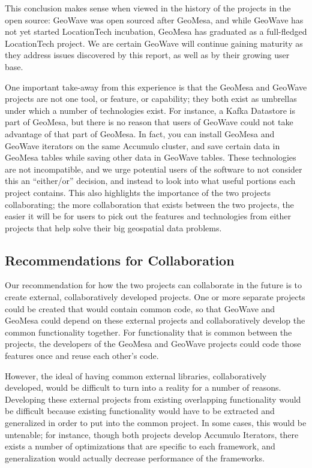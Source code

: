 This conclusion makes sense when viewed in the history of the projects in the open source: GeoWave was open sourced after GeoMesa, and while GeoWave has not yet started LocationTech incubation, GeoMesa has graduated as a full-fledged LocationTech project.
We are certain GeoWave will continue gaining maturity as they address issues discovered by this report, as well as by their growing user base.

One important take-away from this experience is that the GeoMesa and GeoWave projects are not one tool, or feature, or capability; they both exist as umbrellas under which a number of technologies exist.
For instance, a Kafka Datastore is part of GeoMesa, but there is no reason that users of GeoWave could not take advantage of that part of GeoMesa.
In fact, you can install GeoMesa and GeoWave iterators on the same Accumulo cluster, and save certain data in GeoMesa tables while saving other data in GeoWave tables.
These technologies are not incompatible, and we urge potential users of the software to not consider this an ``either/or'' decision, and instead to look into what useful portions each project contains.
This also highlights the importance of the two projects collaborating; the more collaboration that exists between the two projects, the easier it will be for users to pick out the features and technologies from either projects that help solve their big geospatial data problems.


\subsection{Recommendations for Collaboration}
\label{sec:conclusions:collaboration}

Our recommendation for how the two projects can collaborate in the future is to create external, collaboratively developed projects.
One or more separate projects could be created that would contain common code, so that GeoWave and GeoMesa could depend on these external projects and collaboratively develop the common functionality together.
For functionality that is common between the projects, the developers of the GeoMesa and GeoWave projects could code those features once and reuse each other's code.

However, the ideal of having common external libraries, collaboratively developed, would be difficult to turn into a reality for a number of reasons.
Developing these external projects from existing overlapping functionality would be difficult because existing functionality would have to be extracted and generalized in order to put into the common project.
In some cases, this would be untenable; for instance, though both projects develop Accumulo Iterators, there exists a number of optimizations that are specific to each framework, and generalization would actually decrease performance of the frameworks.

